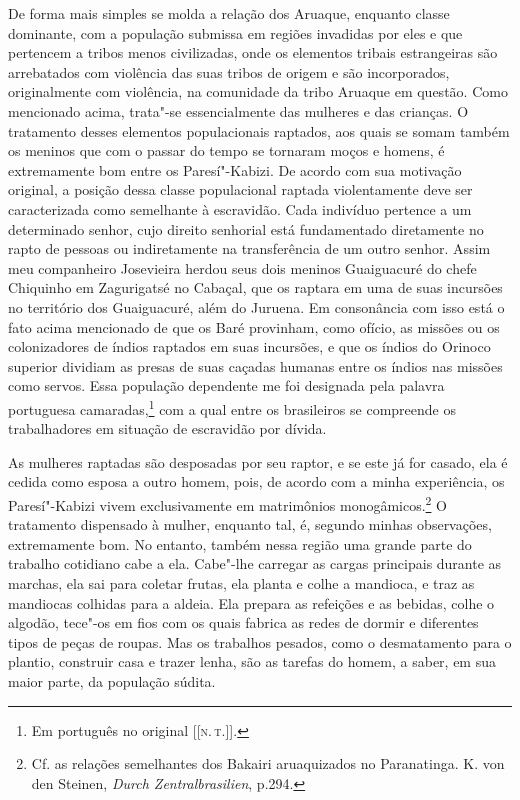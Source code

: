 De forma mais simples se molda a relação dos Aruaque, enquanto classe
dominante, com a população submissa em regiões invadidas por eles e que
pertencem a tribos menos civilizadas, onde os elementos tribais
estrangeiras são arrebatados com violência das suas tribos de origem e
são incorporados, originalmente com violência, na comunidade da tribo
Aruaque em questão. Como mencionado acima, trata"-se essencialmente das
mulheres e das crianças. O tratamento desses elementos populacionais
raptados, aos quais se somam também os meninos que com o passar do
tempo se tornaram moços e homens, é extremamente bom entre os
Paresí"-Kabizi. De acordo com sua motivação original, a posição dessa
classe populacional raptada violentamente deve ser caracterizada como
semelhante à escravidão. Cada indivíduo pertence a um determinado
senhor, cujo direito senhorial está fundamentado diretamente no rapto de
pessoas ou indiretamente na transferência de um outro senhor. Assim meu
companheiro Josevieira herdou seus dois meninos Guaiguacuré do chefe
Chiquinho em Zagurigatsé no Cabaçal, que os raptara em uma de suas
incursões no território dos Guaiguacuré, além do Juruena. Em consonância
com isso está o fato acima mencionado de que os Baré provinham, como
ofício, as missões ou os colonizadores de índios raptados em suas
incursões, e que os índios do Orinoco superior dividiam as presas de
suas caçadas humanas entre os índios nas missões como servos. Essa
população dependente me foi designada pela palavra portuguesa
camaradas,\footnote{Em português no original {[}{[}\textsc{n.\,t.}{]}{]}.} com a qual entre os brasileiros se compreende os
trabalhadores em situação de escravidão por dívida.

As mulheres raptadas são desposadas por seu raptor, e se este já for
casado, ela é cedida como esposa a outro homem, pois, de acordo com a
minha experiência, os Paresí"-Kabizi vivem exclusivamente em matrimônios
monogâmicos.\footnote{Cf. as relações semelhantes dos Bakairi aruaquizados no Paranatinga.
  K. von den Steinen, \emph{Durch Zentralbrasilien}, p.294.} O
tratamento dispensado à mulher, enquanto tal, é, segundo minhas
observações, extremamente bom. No entanto, também nessa região uma
grande parte do trabalho cotidiano cabe a ela. Cabe"-lhe carregar as
cargas principais durante as marchas, ela sai para coletar frutas, ela
planta e colhe a mandioca, e traz as mandiocas colhidas para a aldeia.
Ela prepara as refeições e as bebidas, colhe o algodão, tece"-os em fios
com os quais fabrica as redes de dormir e diferentes tipos de peças de
roupas. Mas os trabalhos pesados, como o desmatamento para o plantio,
construir casa e trazer lenha, são as tarefas do homem, a saber, em sua
maior parte, da população súdita.

